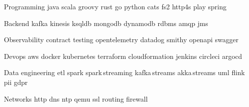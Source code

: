 
\begin{cvskills}

    \cvskill
    {Programming} %
    {java {} scala {} groovy {} rust {} go {} python {} cats {} fs2 {} http4s {} play {} spring}

    \cvskill
    {Backend} %
    {kafka {} kinesis {} ksqldb {} mongodb {} dynamodb {} rdbms {} amqp {} jms}

    \cvskill
    {Observability} %
    {contract testing {} opentelemetry {} datadog {} smithy {} openapi {} swagger}

    \cvskill
    {Devops} %
    {aws {} docker {} kubernetes {} terraform {} cloudformation {} jenkins {} circleci {} argocd}

    \cvskill
    {Data engineering} %
    {etl {} spark {} spark\,streaming {} kafka\,streams {} akka\,streams {} uml {} flink {} pii {} gdpr}


    \cvskill
    {Networks} %
    {http {} dns {} ntp {} qemu {} ssl {} routing {} firewall }

\end{cvskills}
